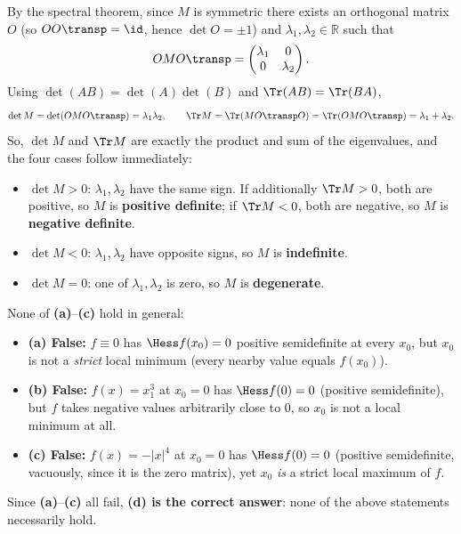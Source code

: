 \begin{exercisesolution}
\label{sol:signature_2x2_matrix}
By the spectral theorem, since $M$ is symmetric there exists an orthogonal matrix $O$
(so $OO\transp = \id$, hence $\det O = \pm 1$) and $\lambda_1, \lambda_2 \in \mathbb{R}$ such that
\[OMO\transp = \begin{pmatrix} \lambda_1 & 0 \\ 0 & \lambda_2 \end{pmatrix}.\]
Using $\det(AB) = \det(A)\det(B)$ and $\Tr(AB) = \Tr(BA)$,
\[\det M = \det(OMO\transp) = \lambda_1\lambda_2, \qquad \Tr M = \Tr(MO\transp O) = \Tr(OMO\transp) = \lambda_1 + \lambda_2.\]
So, $\det M$ and $\Tr M$ are exactly the product and sum of the eigenvalues, and the four cases
follow immediately:
\begin{itemize}
  \item $\det M > 0$: $\lambda_1, \lambda_2$ have the same sign. If additionally $\Tr M > 0$,
    both are positive, so $M$ is \textbf{positive definite}; if $\Tr M < 0$, both are negative,
    so $M$ is \textbf{negative definite}.
  \item $\det M < 0$: $\lambda_1, \lambda_2$ have opposite signs, so $M$ is \textbf{indefinite}.
  \item $\det M = 0$: one of $\lambda_1, \lambda_2$ is zero, so $M$ is \textbf{degenerate}.
\end{itemize}
\end{exercisesolution}

\begin{exercisesolution}
\label{sol:semidefinite_hessian_multiple_choice}
None of \textbf{(a)}--\textbf{(c)} hold in general:
\begin{itemize}
  \item \textbf{(a) False:} $f \equiv 0$ has $\Hess f(x_0) = 0$ positive semidefinite at every
    $x_0$, but $x_0$ is not a \emph{strict} local minimum (every nearby value equals $f(x_0)$).
  \item \textbf{(b) False:} $f(x) = x_1^3$ at $x_0 = 0$ has $\Hess f(0) = 0$ (positive
    semidefinite), but $f$ takes negative values arbitrarily close to $0$, so $x_0$ is not a
    local minimum at all.
  \item \textbf{(c) False:} $f(x) = -\lvert x\rvert^4$ at $x_0 = 0$ has $\Hess f(0) = 0$
    (positive semidefinite, vacuously, since it is the zero matrix), yet $x_0$ \emph{is} a
    strict local maximum of $f$.
\end{itemize}
Since \textbf{(a)}--\textbf{(c)} all fail, \textbf{(d) is the correct answer}: none of the above
statements necessarily hold.
\end{exercisesolution}

